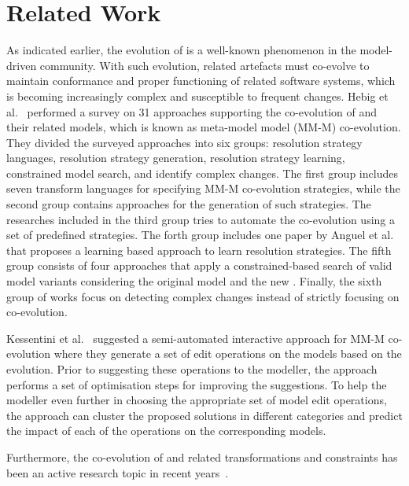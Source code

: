 \section{Related Work} \label{sec:RW}

As indicated earlier, the evolution of \metamodels is a well-known phenomenon in the model-driven community. With such evolution, related artefacts must co-evolve to maintain conformance and proper functioning of related software systems, which is becoming increasingly complex and susceptible to frequent changes. Hebig et al.~\autocite{Hebig2017} performed a survey on 31 approaches supporting the co-evolution of \metamodels and their related models, which is known as meta-model model (MM-M) co-evolution. They divided the surveyed approaches into six groups: resolution strategy languages, resolution strategy generation, resolution strategy learning, constrained model search, and identify complex changes. The first group includes seven transform languages for specifying MM-M co-evolution strategies, while the second group contains approaches for the generation of such strategies. The researches included in the third group tries to automate the co-evolution using a set of predefined strategies. The forth group includes one paper by Anguel et al.~\autocite{6581482} that proposes a learning based approach to learn resolution strategies. The fifth group consists of four approaches that apply a constrained-based search of valid model variants considering the original model and the new \metamodel. Finally, the sixth group of works focus on detecting complex \metamodel changes instead of strictly focusing on co-evolution.

Kessentini et al.~\autocite{Kessentini2022} suggested a semi-automated interactive approach for MM-M co-evolution where they generate a set of edit operations on the models based on the \metamodel evolution. Prior to suggesting these operations to the modeller, the approach performs a set of optimisation steps for improving the suggestions. To help the modeller even further in choosing the appropriate set of model edit operations, the approach can cluster the proposed solutions in different categories and predict the impact of each of the operations on the corresponding models.

Furthermore, the co-evolution of \metamodel and related transformations and constraints has been an active research topic in recent years~\autocite{Kusel2015, Khelladi2017, garcia2013}.



